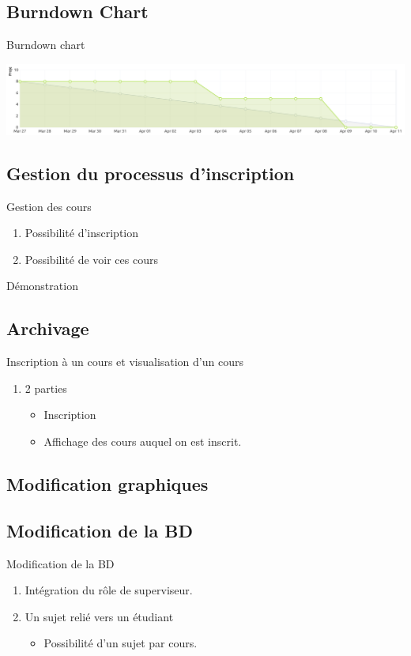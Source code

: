 \documentclass[numbering=fraction]{beamer}
\begin{document}
\subsection{Burndown Chart}
\begin{frame}{Burndown chart}
    \centering
    
    \includegraphics[width=1.1\textwidth]{burndownChart.png} 
\end{frame}

\subsection{Gestion du processus d'inscription}
\begin{frame}{Gestion des cours}
    \begin{enumerate}
        \item Possibilité d'inscription
        \item Possibilité de voir ces cours
    \end{enumerate}
    Démonstration
\end{frame}
\subsection{Archivage}
\begin{frame}{Inscription à un cours et visualisation d'un cours}
    \begin{enumerate}
        \item 2 parties
        \begin{itemize}
            \item Inscription
            \item Affichage des cours auquel on est inscrit.
        \end{itemize}
    \end{enumerate}
\end{frame}
\subsection{Modification graphiques}
\subsection{Modification de la BD}
\begin{frame}{Modification de la BD}
    \begin{enumerate}
        \item Intégration du rôle de superviseur.
        \item Un sujet relié vers un étudiant
        \begin{itemize}
            \item Possibilité d'un sujet par cours.
        \end{itemize}
    \end{enumerate}
\end{frame}
\end{document}
